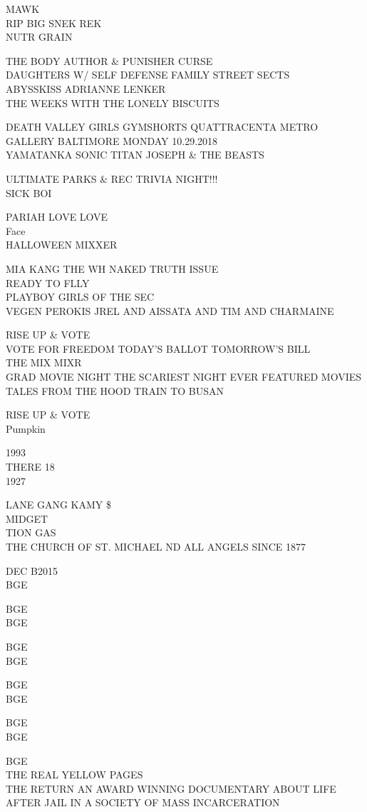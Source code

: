 \documentclass[10pt,letterpaper]{article}
\begin{document}
MAWK\\
RIP BIG SNEK REK\\
NUTR GRAIN

THE BODY AUTHOR \& PUNISHER CURSE\\
DAUGHTERS W/ SELF DEFENSE FAMILY STREET SECTS\\
ABYSSKISS ADRIANNE LENKER\\
THE WEEKS WITH THE LONELY BISCUITS

DEATH VALLEY GIRLS GYMSHORTS QUATTRACENTA METRO GALLERY BALTIMORE MONDAY 10.29.2018\\
YAMATANKA SONIC TITAN JOSEPH \& THE BEASTS

ULTIMATE PARKS \& REC TRIVIA NIGHT!!!\\
SICK BOI

PARIAH LOVE LOVE\\
Face\\
HALLOWEEN MIXXER

MIA KANG THE WH NAKED TRUTH ISSUE\\
READY TO FLLY\\
PLAYBOY GIRLS OF THE SEC\\
VEGEN PEROKIS JREL AND AISSATA AND TIM AND CHARMAINE

RISE UP \& VOTE\\
VOTE FOR FREEDOM TODAY'S BALLOT TOMORROW'S BILL\\
THE MIX MIXR\\
GRAD MOVIE NIGHT THE SCARIEST NIGHT EVER FEATURED MOVIES TALES FROM THE HOOD TRAIN TO BUSAN

RISE UP \& VOTE\\
Pumpkin

1993\\
THERE 18\\
1927

LANE GANG KAMY \$\\
MIDGET\\
TION GAS\\
THE CHURCH OF ST. MICHAEL ND ALL ANGELS SINCE 1877

DEC B2015\\
BGE

BGE\\
BGE

BGE\\
BGE

BGE\\
BGE

BGE\\
BGE

BGE\\
THE REAL YELLOW PAGES\\
THE RETURN AN AWARD WINNING DOCUMENTARY ABOUT LIFE AFTER JAIL IN A SOCIETY OF MASS INCARCERATION
\end{document}
